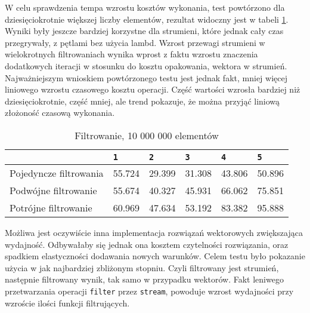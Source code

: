 \documentclass[a4paper,10pt]{report}
\begin{document}
W celu sprawdzenia tempa wzrostu kosztów wykonania, test powtórzono dla dziesięciokrotnie większej liczby elementów, rezultat widoczny jest w tabeli \ref{tab2}. Wyniki były jeszcze bardziej korzystne dla strumieni, które jednak cały czas przegrywały, z pętlami bez użycia lambd. Wzrost przewagi strumieni w wielokrotnych filtrowaniach wynika wprost z faktu wzrostu znaczenia dodatkowych iteracji w stosunku do kosztu opakowania, wektora w strumień. Najważniejszym wnioskiem powtórzonego testu jest jednak fakt, mniej więcej liniowego wzrostu czasowego kosztu operacji. Część wartości wzrosła bardziej niż dziesięciokrotnie, część mniej, ale trend pokazuje, że można przyjąć liniową złożoność czasową wykonania.
\begin{table}[t]
	\caption{Filtrowanie, 10 000 000 elementów}
	\label{tab2}
	\begin{tabular}{|l|l|l|l|l|l|}
		\hline 
		& \verb|1| & \verb|2| & \verb|3| & \verb|4| & \verb|5|\\
		\hline
		Pojedyncze filtrowania & 55.724 & 29.399 & 31.308 &	43.806 & 50.896 \\
		\hline
		Podwójne filtrowanie & 55.674 & 40.327 & 45.931 & 66.062 & 75.851\\
		\hline
		Potrójne filtrowanie & 60.969 &	47.634 & 53.192	& 83.382 & 95.888 \\
		\hline
	\end{tabular} 
\end{table}
Możliwa jest oczywiście inna implementacja rozwiązań wektorowych zwiększająca wydajność. Odbywałaby się jednak ona kosztem czytelności rozwiązania, oraz spadkiem elastyczności dodawania nowych warunków. Celem testu było pokazanie użycia w jak najbardziej zbliżonym stopniu. Czyli filtrowany jest strumień, następnie filtrowany wynik, tak samo w przypadku wektorów. Fakt leniwego przetwarzania operacji \verb|filter| przez \verb|stream|, powoduje wzrost wydajności przy wzroście ilości funkcji filtrujących.
\end{document}
